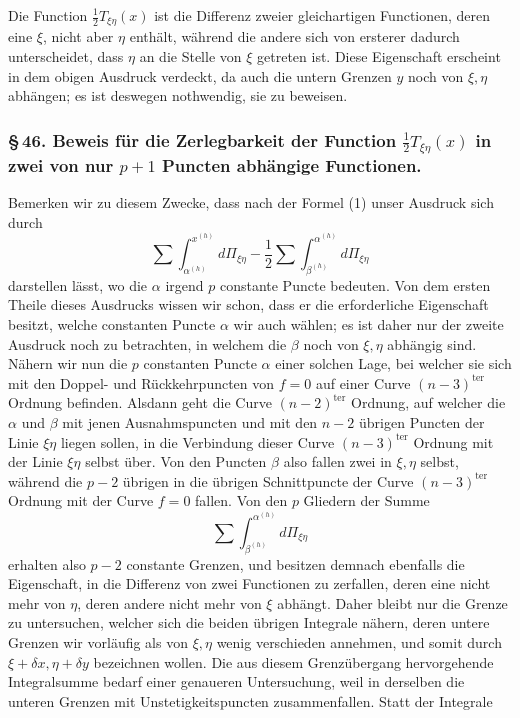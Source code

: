 \documentclass[10pt]{article}
\begin{document}
Die Function \(\frac12T_{\xi\eta}(x)\) ist die Differenz zweier gleichartigen Functionen, deren eine \(\xi\), nicht aber \(\eta\) enthält, während die andere sich von ersterer dadurch unterscheidet, dass \(\eta\) an die Stelle von \(\xi\) getreten ist. Diese Eigenschaft erscheint in dem obigen Ausdruck verdeckt, da auch die untern Grenzen \(y\) noch von \(\xi,\eta\) abhängen; es ist deswegen nothwendig, sie zu beweisen.

\subsubsection*{\S\,46. Beweis für die Zerlegbarkeit der Function \(\frac12T_{\xi\eta}(x)\) in zwei von nur \(p+1\) Puncten abhängige Functionen.}

Bemerken wir zu diesem Zwecke, dass nach der Formel (1) unser Ausdruck sich durch
\[
\sum\int_{\alpha^{(h)}}^{x^{(h)}}d\Pi_{\xi\eta}
-\frac12\sum\int_{\beta^{(h)}}^{\alpha^{(h)}}d\Pi_{\xi\eta}
\]
darstellen lässt, wo die \(\alpha\) irgend \(p\) constante Puncte bedeuten. Von dem ersten Theile dieses Ausdrucks wissen wir schon, dass er die erforderliche Eigenschaft besitzt, welche constanten Puncte \(\alpha\) wir auch wählen; es ist daher nur der zweite Ausdruck noch zu betrachten, in welchem die \(\beta\) noch von \(\xi,\eta\) abhängig sind. Nähern wir nun die \(p\) constanten Puncte \(\alpha\) einer solchen Lage, bei welcher sie sich mit den Doppel- und Rückkehrpuncten von \(f=0\) auf einer Curve \((n-3)^{\mathrm{ter}}\) Ordnung befinden. Alsdann geht die Curve \((n-2)^{\mathrm{ter}}\) Ordnung, auf welcher die \(\alpha\) und \(\beta\) mit jenen Ausnahmspuncten und mit den \(n-2\) übrigen Puncten der Linie \(\xi\eta\) liegen sollen, in die Verbindung dieser Curve \((n-3)^{\mathrm{ter}}\) Ordnung mit der Linie \(\xi\eta\) selbst über. Von den Puncten \(\beta\) also fallen zwei in \(\xi,\eta\) selbst, während die \(p-2\) übrigen in die übrigen Schnittpuncte der Curve \((n-3)^{\mathrm{ter}}\) Ordnung mit der Curve \(f=0\) fallen. Von den \(p\) Gliedern der Summe
\[
\sum\int_{\beta^{(h)}}^{\alpha^{(h)}}d\Pi_{\xi\eta}
\]
erhalten also \(p-2\) constante Grenzen, und besitzen demnach ebenfalls die Eigenschaft, in die Differenz von zwei Functionen zu zerfallen, deren eine nicht mehr von \(\eta\), deren andere nicht mehr von \(\xi\) abhängt. Daher bleibt nur die Grenze zu untersuchen, welcher sich die beiden übrigen Integrale nähern, deren untere Grenzen wir vorläufig als von \(\xi,\eta\) wenig verschieden annehmen, und somit durch \(\xi+\delta x,\eta+\delta y\) bezeichnen wollen. Die aus diesem Grenzübergang hervorgehende Integralsumme bedarf einer genaueren Untersuchung, weil in derselben die unteren Grenzen mit Unstetigkeitspuncten zusammenfallen. Statt der Integrale
\end{document}
